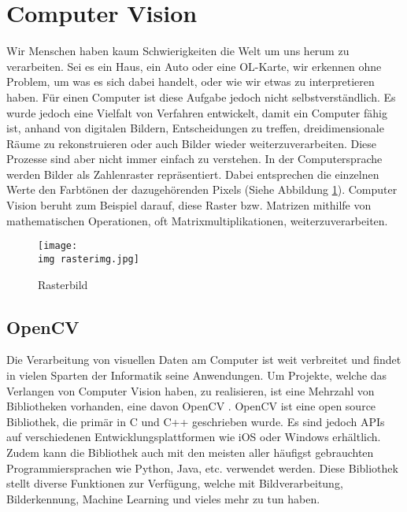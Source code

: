 \section{Computer Vision}

Wir Menschen haben kaum Schwierigkeiten die Welt um uns herum zu verarbeiten. Sei es ein Haus, ein Auto oder eine OL-Karte, wir erkennen ohne Problem, um was es sich dabei handelt, oder wie wir etwas zu interpretieren haben. Für einen Computer ist diese Aufgabe jedoch nicht selbstverständlich. Es wurde jedoch eine Vielfalt von Verfahren entwickelt, damit ein Computer fähig ist, anhand von digitalen Bildern, Entscheidungen zu treffen, dreidimensionale Räume zu rekonstruieren oder auch Bilder wieder  weiterzuverarbeiten. Diese Prozesse sind aber nicht immer einfach zu verstehen. In der Computersprache werden Bilder als Zahlenraster repräsentiert. Dabei entsprechen die einzelnen Werte den Farbtönen der dazugehörenden Pixels (Siehe Abbildung \ref{fig:rasterimg}). \cite{computervision_szeliski:1, opencv_bradski_kaehler:1} Computer Vision beruht zum Beispiel darauf, diese Raster bzw. Matrizen mithilfe von mathematischen Operationen, oft Matrixmultiplikationen, weiterzuverarbeiten.

\begin{figure}[hbt]
	\centering
	\texttt{[image: \\img rasterimg.jpg]}
	\caption{Rasterbild}
	\label{fig:rasterimg}
\end{figure}


\subsection{OpenCV}

Die Verarbeitung von visuellen Daten am Computer ist weit verbreitet und findet in vielen Sparten der Informatik seine Anwendungen. Um Projekte, welche das Verlangen von Computer Vision haben, zu realisieren, ist eine Mehrzahl von Bibliotheken vorhanden, eine davon OpenCV \cite{opencv:1}. OpenCV ist eine open source Bibliothek, die primär in C und C++ geschrieben wurde. Es sind jedoch APIs auf verschiedenen Entwicklungsplattformen wie iOS oder Windows erhältlich. Zudem kann die Bibliothek auch mit den meisten aller häufigst gebrauchten Programmiersprachen wie Python, Java, etc. verwendet werden. Diese Bibliothek stellt diverse Funktionen zur Verfügung, welche mit Bildverarbeitung, Bilderkennung, Machine Learning und vieles mehr zu tun haben.\cite{opencv_bradski_kaehler:1}



